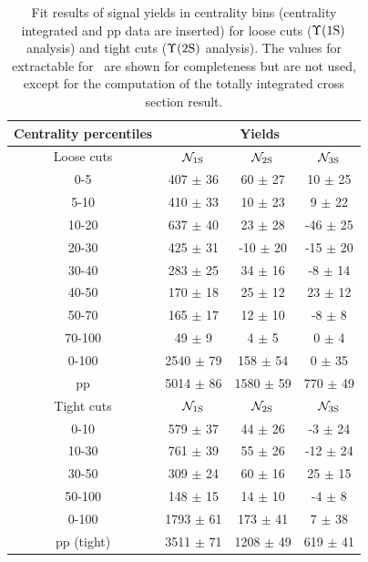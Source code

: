 \begin{table}[hbtp]
  \begin{centering}
    \begin{tabular}{c|c|c|c}
      \hline
      Centrality percentiles &  \multicolumn{3}{c}{ Yields }  \\                                               
      \hline
      Loose cuts & ${\cal N}_{\rm 1S}$ & ${\cal N}_{\rm 2S}$ & ${\cal N}_{\rm 3S}$ \\  
      \hline
      0-5    & 407 $\pm$  36 &   60 $\pm$  27 &  10 $\pm$ 25 \\  
      5-10   & 410 $\pm$ 33 &  10 $\pm$ 23 &  9 $\pm$ 22 \\  
      10-20  & 637 $\pm$ 40 &  23 $\pm$ 28 &  -46 $\pm$ 25 \\  
      20-30  & 425 $\pm$ 31 &  -10 $\pm$ 20 &  -15 $\pm$ 20 \\  
      30-40  & 283 $\pm$ 25 &  34 $\pm$ 16 &  -8 $\pm$ 14 \\  
      40-50  & 170 $\pm$ 18 &  25 $\pm$ 12 &  23 $\pm$ 12 \\  
      50-70  & 165 $\pm$ 17 &  12 $\pm$ 10 &  -8 $\pm$ 8 \\  
      70-100 & 49 $\pm$ 9 &  4 $\pm$ 5 &  0 $\pm$ 4 \\  
      \hline 
      0-100 & 2540 $\pm$ 79 &  158 $\pm$ 54 &  0 $\pm$ 35 \\  
      pp   & 5014 $\pm$ 86 &  1580 $\pm$ 59 &  770 $\pm$ 49 \\  
      \hline
      Tight cuts & ${\cal N}_{\rm 1S}$ & ${\cal N}_{\rm 2S}$ & ${\cal N}_{\rm 3S}$ \\  
      \hline 
      0-10  & 579 $\pm$ 37 &  44 $\pm$ 26 &  -3 $\pm$ 24 \\  
      10-30  & 761 $\pm$ 39 &  55 $\pm$ 26 &  -12 $\pm$ 24 \\  
      30-50  & 309 $\pm$ 24 &  60 $\pm$ 16 &  25 $\pm$ 15 \\  
      50-100 & 148 $\pm$ 15 &  14 $\pm$ 10 &  -4 $\pm$ 8 \\  
      \hline 
      0-100 & 1793 $\pm$ 61 &  173 $\pm$ 41 &  7 $\pm$ 38 \\  
      pp (tight)  & 3511 $\pm$ 71 &  1208 $\pm$ 49 &  619 $\pm$ 41 \\  
    \end{tabular}
    
    \caption{Fit results of signal yields in centrality bins
      (centrality integrated and pp data are inserted) for loose cuts
      ($\Upsilon\mathrm{(1S)}$ analysis) and tight cuts ($\Upsilon\mathrm{(2S)}$ analysis). The values
    for extractable for \PgUc\ are shown for completeness but are not
    used, except for the computation of the totally integrated cross
    section result.} 
    \label{tab:YieldsCentrality}
  \end{centering}
\end{table}



